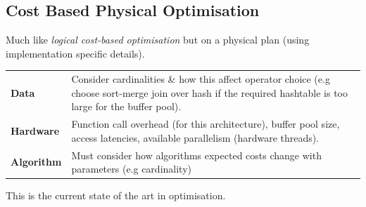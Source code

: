\subsection{Cost Based Physical Optimisation}
Much like \textit{logical cost-based optimisation} but on a physical plan (using implementation specific details).
\begin{center}
    \begin{tabular}{l p{}}
        \textbf{Data}      & Consider cardinalities \& how this affect operator choice (e.g choose sort-merge join over hash if the required hashtable is too large for the buffer pool). \\
        \textbf{Hardware}  & Function call overhead (for this architecture), buffer pool size, access latencies, available parallelism (hardware threads). \\
        \textbf{Algorithm} & Must consider how algorithms expected costs change with parameters (e.g cardinality) \\ 
    \end{tabular}
\end{center}
This is the current state of the art in optimisation. 

